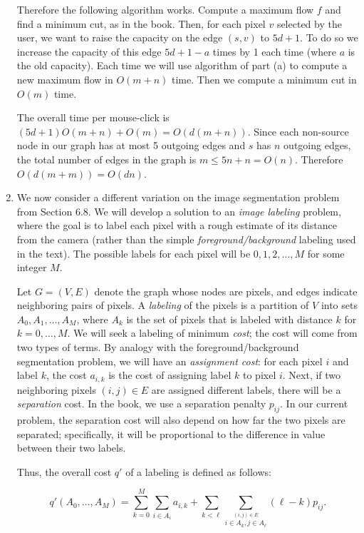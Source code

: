 \documentclass[12pt]{article}
\begin{document}
\begin{enumerate}
{Therefore the following algorithm works.
Compute a maximum flow $f$ and find a minimum cut, as in the book.
Then, for each pixel $v$ selected by the user, we want to
raise the capacity on the edge $(s,v)$ to $5d + 1$.
To do so we increase the capacity of this edge $5d + 1-a$ times by 1 each time
(where $a$ is the old capacity). Each time we will use algorithm of part (a) to
compute a new maximum flow in $O(m+n)$ time.
Then we compute a minimum cut in $O(m)$ time.

The overall time per mouse-click is $(5d+1)O(m+n)+O(m)=O(d(m+n))$.
Since each non-source node in our graph has at most 5 outgoing edges
and $s$ has $n$ outgoing edges, the total number of edges in the graph is
$m\le 5n+n=O(n)$. Therefore $O(d(m+m))=O(dn)$.

}


\item 

We now consider a different variation on the
image segmentation problem from Section 6.8.
We will develop a solution to an {\em image labeling} problem,
where the goal is to label each pixel with a rough
estimate of its distance from the camera
(rather than the simple {\em foreground/background}
labeling used in the text).
The possible labels for each pixel will be
$0, 1, 2, \ldots, M$ for some integer $M$.

Let $G=(V,E)$ denote the graph whose nodes are pixels, and edges
indicate neighboring pairs of pixels. A {\em labeling}
of the pixels is a partition
of $V$ into sets $A_0, A_1, \ldots, A_M$,
where $A_k$ is the set of pixels that
is labeled with distance $k$ for $k=0, \ldots, M$.
We will seek a labeling of minimum {\em cost};
the cost will come from two types of terms.
By analogy with the foreground/background
segmentation problem, we will have an {\em assignment cost}:
for each pixel $i$ and label $k$, the cost $a_{i,k}$ is the
cost of assigning label $k$ to pixel $i$.
Next, if two neighboring pixels
$(i,j)\in E$ are assigned different labels, there will be a
{\em separation} cost. In the book, we use a separation
penalty $p_{ij}$. In our current problem, the separation
cost will also depend on how far the two pixels
are separated; specifically, it will be proportional
to the difference in value between their two labels.

Thus, the overall cost $q'$ of a labeling is defined as follows:

$$q'(A_0,\ldots,A_M)=\sum_{k=0}^M \sum_{i \in A_i} a_{i,k} +
\sum_{k<\ell}
\sum_{\stackrel{(i,j) \in E}{i\in A_k, j \in A_\ell}} (\ell-k)p_{ij}.$$


\end{enumerate}
\end{document}
